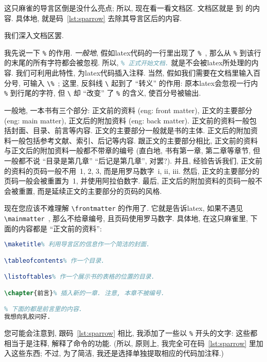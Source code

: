 这只麻雀的导言区倒是没什么亮点;
所以, 现在看一看文档区.
文档区就是
\verb`` 到 \verb`` 的内容.
具体地, 就是码~\ref{lst:sparrow} 去除其导言区后的内容.

我们深入文档区罢.

我先说一下 \verb`%` 的作用.
\emph{一般地}, 假如\gls{latex}代码的一行里出现了 \verb`%`~,
那么从 \verb`%` 到该行的末尾的所有字符都会被忽视.
所以,
\lstinline[language=TeX]`% 正式开始文档.`
就是不会被\gls{latex}所处理的内容.
我们可利用此特性, 为\gls{latex}代码插入注释.
当然, 假如我们需要在文档里输入百分号, 可输入 \verb`\%`~;
这里, 反斜线 \verb`\` 起到了 ``转义'' 的作用:
原本\gls{latex}会忽视一行内 \verb`%` 到行尾的字符,
但 \verb`\` 却 ``改变'' 了 \verb`%` 的含义, 使百分号被输出.

一般地, 一本书有三个部分:
正文前的资料 (\gls{eng}: front matter),
正文的主要部分 (\gls{eng}: main matter),
正文后的附加资料 (\gls{eng}: back matter).
正文前的资料一般包括封面、目录、前言等内容.
正文的主要部分一般就是书的主体.
正文后的附加资料一般包括参考文献、索引、后记等内容.
跟正文的主要部分相比,
正文前的资料与正文后的附加资料一般都不带章的编号
(直白地, 书有第一章, 第二章等章节,
但一般都不说 ``目录是第几章'' ``后记是第几章'', 对罢?).
并且, 经验告诉我们, 正文前的资料的页码一般不用~1, 2, 3,
而是用罗马数字~i, ii, iii.
然后, 正文的主要部分的页码一般会被重置为~1, 并使用阿拉伯数字.
最后, 正文后的附加资料的页码一般不会被重置,
而是延续正文的主要部分的页码的风格.

现在您应该不难理解 \verb`\frontmatter` 的作用了.
它就是告诉\gls{latex}, 如果不遇见 \verb`\mainmatter`~,
那么不给章编号, 且页码使用罗马数字.
具体地, 在这只麻雀里, 下面的内容都是 ``正文前的资料'':

\begin{lstlisting}[language=TeX]
\maketitle% 利用导言区的信息作一个简洁的封面.

\tableofcontents% 作一个目录.

\listoftables% 作一个展示书的表格的位置的目录.

\chapter{前言}% 插入新的一章. 注意, 本章不被编号.

% 下面的都是前言里的内容.
我想向乳胶问好.
\end{lstlisting}

您可能会注意到, 跟码~\ref{lst:sparrow} 相比,
我添加了一些以 \verb`%` 开头的文字:
这些都相当于是注释, 解释了命令的功能.
(所以, 原则上,
我完全可在码~\ref{lst:sparrow} 里加入这些东西;
不过, 为了简洁, 我还是选择单独提取相应的代码加注释.)

